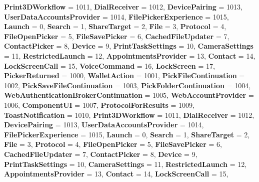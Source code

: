 \begin{DoxyCompactItemize}
{\bfseries Print3\+D\+Workflow} = 1011, 
{\bfseries Dial\+Receiver} = 1012, 
{\bfseries Device\+Pairing} = 1013, 
\newline
{\bfseries User\+Data\+Accounts\+Provider} = 1014, 
{\bfseries File\+Picker\+Experience} = 1015, 
{\bfseries Launch} = 0, 
{\bfseries Search} = 1, 
\newline
{\bfseries Share\+Target} = 2, 
{\bfseries File} = 3, 
{\bfseries Protocol} = 4, 
{\bfseries File\+Open\+Picker} = 5, 
\newline
{\bfseries File\+Save\+Picker} = 6, 
{\bfseries Cached\+File\+Updater} = 7, 
{\bfseries Contact\+Picker} = 8, 
{\bfseries Device} = 9, 
\newline
{\bfseries Print\+Task\+Settings} = 10, 
{\bfseries Camera\+Settings} = 11, 
{\bfseries Restricted\+Launch} = 12, 
{\bfseries Appointments\+Provider} = 13, 
\newline
{\bfseries Contact} = 14, 
{\bfseries Lock\+Screen\+Call} = 15, 
{\bfseries Voice\+Command} = 16, 
{\bfseries Lock\+Screen} = 17, 
\newline
{\bfseries Picker\+Returned} = 1000, 
{\bfseries Wallet\+Action} = 1001, 
{\bfseries Pick\+File\+Continuation} = 1002, 
{\bfseries Pick\+Save\+File\+Continuation} = 1003, 
\newline
{\bfseries Pick\+Folder\+Continuation} = 1004, 
{\bfseries Web\+Authentication\+Broker\+Continuation} = 1005, 
{\bfseries Web\+Account\+Provider} = 1006, 
{\bfseries Component\+UI} = 1007, 
\newline
{\bfseries Protocol\+For\+Results} = 1009, 
{\bfseries Toast\+Notification} = 1010, 
{\bfseries Print3\+D\+Workflow} = 1011, 
{\bfseries Dial\+Receiver} = 1012, 
\newline
{\bfseries Device\+Pairing} = 1013, 
{\bfseries User\+Data\+Accounts\+Provider} = 1014, 
{\bfseries File\+Picker\+Experience} = 1015, 
{\bfseries Launch} = 0, 
\newline
{\bfseries Search} = 1, 
{\bfseries Share\+Target} = 2, 
{\bfseries File} = 3, 
{\bfseries Protocol} = 4, 
\newline
{\bfseries File\+Open\+Picker} = 5, 
{\bfseries File\+Save\+Picker} = 6, 
{\bfseries Cached\+File\+Updater} = 7, 
{\bfseries Contact\+Picker} = 8, 
\newline
{\bfseries Device} = 9, 
{\bfseries Print\+Task\+Settings} = 10, 
{\bfseries Camera\+Settings} = 11, 
{\bfseries Restricted\+Launch} = 12, 
\newline
{\bfseries Appointments\+Provider} = 13, 
{\bfseries Contact} = 14, 
{\bfseries Lock\+Screen\+Call} = 15, 

\end{DoxyCompactItemize}
